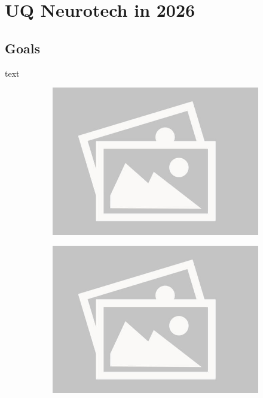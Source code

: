 \documentclass[a4paper,12pt]{report}
\begin{document}
\section*{UQ Neurotech in 2026}
\subsection*{Goals}
text
\begin{figure}[H]
    \centering
    \begin{subfigure}{0.32\linewidth}
        \includegraphics[width=0.99\linewidth]{./photos/placeholder.jpg}
    \end{subfigure}
    \begin{subfigure}{0.32\linewidth}
        \includegraphics[width=0.99\linewidth]{./photos/placeholder.jpg}

\end{subfigure}
\end{figure}
\end{document}
